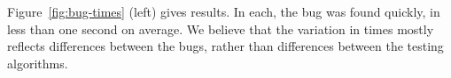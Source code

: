 
Figure~\ref{fig:bug-times} (left) gives results.  In each, the bug was found
quickly, in less than one second on average.  We believe that the variation in
times mostly reflects differences between the bugs, rather than differences
between the testing algorithms.





